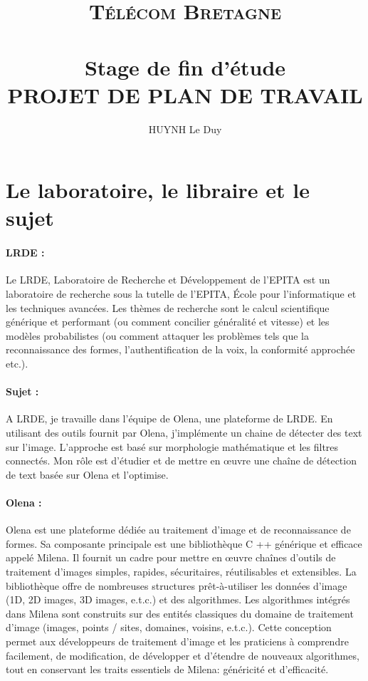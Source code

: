 \documentclass[12pt,a4paper]{article}
\title{	
\normalfont \normalsize 
\textsc{Télécom Bretagne} \\ [25pt] %
\horrule{0.5pt} \\[0.4cm] %
\huge Stage de fin d'étude \\ %
\textsc{PROJET DE PLAN DE TRAVAIL}
\horrule{2pt} \\[0.5cm] %
}
\author{HUYNH Le Duy} %
\date{\normalsize \mydate} %
\begin{document}
\maketitle %
\section{Le laboratoire, le libraire et le sujet}
	\paragraph{LRDE :}
	Le LRDE, Laboratoire de Recherche et Développement de l'EPITA est un laboratoire de recherche sous la tutelle de l'EPITA,  École pour l'informatique et les techniques avancées. Les thèmes de recherche sont le calcul scientifique générique et performant (ou comment concilier généralité et vitesse) et les modèles probabilistes (ou comment attaquer les problèmes tels que la reconnaissance des formes, l'authentification de la voix, la conformité approchée etc.).
	\paragraph{Sujet :}
A LRDE, je travaille dans l'équipe de Olena, une plateforme de LRDE. En utilisant des outils fournit par Olena, j'implémente un chaine de détecter des text sur l'image. L'approche est basé sur morphologie mathématique et les filtres connectés. Mon rôle est d'étudier et de mettre en œuvre une chaîne de détection de text basée sur Olena et l'optimise.
	
	\paragraph{Olena :}
Olena est une plateforme dédiée au traitement d'image et de reconnaissance de formes. Sa composante principale est une bibliothèque C ++ générique et efficace appelé Milena. Il fournit un cadre pour mettre en œuvre chaînes d'outils de traitement d'images simples, rapides, sécuritaires, réutilisables et extensibles. La bibliothèque offre de nombreuses structures prêt-à-utiliser les données d'image (1D, 2D images, 3D images, e.t.c.) et des algorithmes. Les algorithmes intégrés dans Milena sont construits sur des entités classiques du domaine de traitement d'image (images, points / sites, domaines, voisins, e.t.c.). Cette conception permet aux développeurs de traitement d'image et les praticiens à comprendre facilement, de modification, de développer et d'étendre de nouveaux algorithmes, tout en conservant les traits essentiels de Milena: généricité et d'efficacité.
\end{document}
